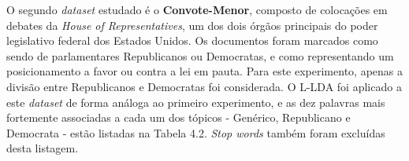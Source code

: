 

O segundo \emph{dataset} estudado é o \textbf{Convote-Menor}, composto de colocações em debates da \emph{House of Representatives}, um dos dois órgãos principais do poder legislativo federal dos Estados Unidos. Os documentos foram marcados como sendo de parlamentares Republicanos ou Democratas, e como representando um posicionamento a favor ou contra a lei em pauta. Para este experimento, apenas a divisão entre Republicanos e Democratas foi considerada. O L-LDA foi aplicado a este \emph{dataset} de forma análoga ao primeiro experimento, e as dez palavras mais fortemente associadas a cada um dos tópicos - Genérico, Republicano e Democrata - estão listadas na Tabela 4.2. \emph{Stop words} também foram excluídas desta listagem.




